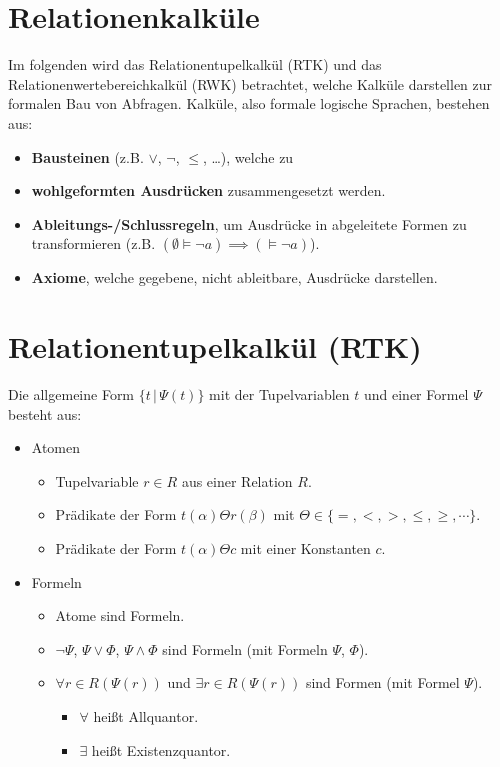 \documentclass[a4paper, 11pt, accentcolor = tud3b]{tudreport}
\providecommand{\forwhich}{\ensuremath{{\,\vert\,}}}
\begin{document}
        \section{Relationenkalküle} %
            Im folgenden wird das Relationentupelkalkül (RTK) und das Relationenwertebereichkalkül (RWK) betrachtet, welche Kalküle darstellen zur formalen Bau von Abfragen. Kalküle, also formale logische Sprachen, bestehen aus:
            \begin{itemize}
            	\item \textbf{Bausteinen} (z.B. \(\lor\), \(\lnot\), \(\leq\), \dots), welche zu
            	\item \textbf{wohlgeformten Ausdrücken} zusammengesetzt werden.
            	\item \textbf{Ableitungs-/Schlussregeln}, um Ausdrücke in abgeleitete Formen zu transformieren (z.B. \( (\emptyset \models \lnot a) \implies (\models \lnot a) \)).
            	\item \textbf{Axiome}, welche gegebene, nicht ableitbare, Ausdrücke darstellen.
            \end{itemize}

        \section{Relationentupelkalkül (RTK)} %
            Die allgemeine Form \( \{ t \forwhich \Psi(t) \} \) mit der Tupelvariablen \(t\) und einer Formel \(\Psi\) besteht aus:
            \begin{itemize}
            	\item Atomen
            		\begin{itemize}
            			\item Tupelvariable \( r \in R \) aus einer Relation \(R\).
            			\item Prädikate der Form \( t(\alpha) \Theta r(\beta) \) mit \( \Theta \in \{ =, <, >, \leq, \geq, \cdots \} \).
            			\item Prädikate der Form \( t(\alpha) \Theta c \) mit einer Konstanten \(c\).
            		\end{itemize}
            	\item Formeln
            		\begin{itemize}
            			\item Atome sind Formeln.
            			\item \( \lnot\Psi \), \( \Psi \lor \Phi \), \( \Psi \land \Phi \) sind Formeln (mit Formeln \(\Psi\), \(\Phi\)).
            			\item \( \forall r \in R (\Psi(r)) \) und \( \exists r \in R (\Psi(r)) \) sind Formen (mit Formel \(\Psi\)).
            				\begin{itemize}
            					\item \( \forall \) heißt Allquantor.
            					\item \( \exists \) heißt Existenzquantor.
            				\end{itemize}
            		\end{itemize}
            \end{itemize}
\end{document}
